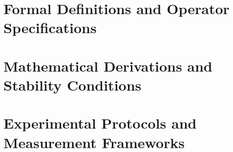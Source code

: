 \documentclass[12pt]{article}
\begin{document}

\appendix

\section{Formal Definitions and Operator Specifications}

\section{Mathematical Derivations and Stability Conditions}

\section{Experimental Protocols and Measurement Frameworks}

\end{document}
